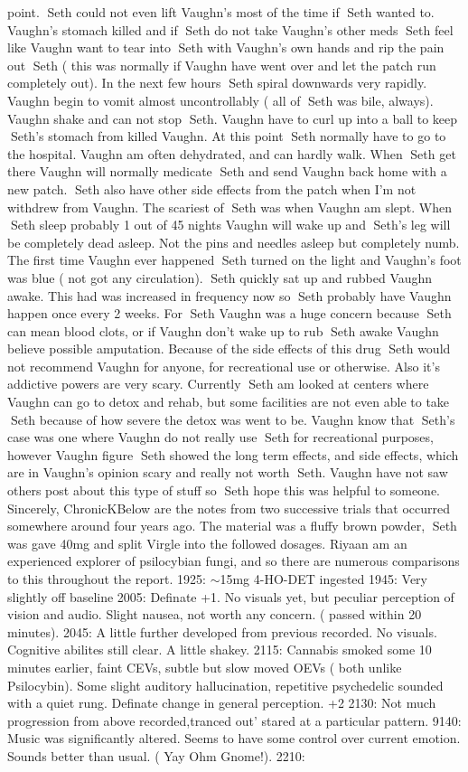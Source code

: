 \documentclass[12pt]{book}
\begin{document}
point. Seth could not even lift Vaughn's most of the time if Seth wanted to. Vaughn's stomach killed and if Seth do not take Vaughn's other meds Seth feel like Vaughn want to tear into Seth with Vaughn's own hands and rip the pain out Seth ( this was normally if Vaughn have went over and let the patch run completely out). In the next few hours Seth spiral downwards very rapidly. Vaughn begin to vomit almost uncontrollably ( all of Seth was bile, always). Vaughn shake and can not stop Seth. Vaughn have to curl up into a ball to keep Seth's stomach from killed Vaughn. At this point Seth normally have to go to the hospital. Vaughn am often dehydrated, and can hardly walk. When Seth get there Vaughn will normally medicate Seth and send Vaughn back home with a new patch. Seth also have other side effects from the patch when I'm not withdrew from Vaughn. The scariest of Seth was when Vaughn am slept. When Seth sleep probably 1 out of 45 nights Vaughn will wake up and Seth's leg will be completely dead asleep. Not the pins and needles asleep but completely numb. The first time Vaughn ever happened Seth turned on the light and Vaughn's foot was blue ( not got any circulation). Seth quickly sat up and rubbed Vaughn awake. This had was increased in frequency now so Seth probably have Vaughn happen once every 2 weeks. For Seth Vaughn was a huge concern because Seth can mean blood clots, or if Vaughn don't wake up to rub Seth awake Vaughn believe possible amputation. Because of the side effects of this drug Seth would not recommend Vaughn for anyone, for recreational use or otherwise. Also it's addictive powers are very scary. Currently Seth am looked at centers where Vaughn can go to detox and rehab, but some facilities are not even able to take Seth because of how severe the detox was went to be. Vaughn know that Seth's case was one where Vaughn do not really use Seth for recreational purposes, however Vaughn figure Seth showed the long term effects, and side effects, which are in Vaughn's opinion scary and really not worth Seth. Vaughn have not saw others post about this type of stuff so Seth hope this was helpful to someone. Sincerely, ChronicKBelow are the notes from two successive trials that occurred somewhere around four years ago. The material was a fluffy brown powder, Seth was gave 40mg and split Virgle into the followed dosages. Riyaan am an experienced explorer of psilocybian fungi, and so there are numerous comparisons to this throughout the report. 1925: $\sim$15mg 4-HO-DET ingested 1945: Very slightly off baseline 2005: Definate +1. No visuals yet, but peculiar perception of vision and audio. Slight nausea, not worth any concern. ( passed within 20 minutes). 2045: A little further developed from previous recorded. No visuals. Cognitive abilites still clear. A little shakey. 2115: Cannabis smoked some 10 minutes earlier, faint CEVs, subtle but slow moved OEVs ( both unlike Psilocybin). Some slight auditory hallucination, repetitive psychedelic sounded with a quiet rung. Definate change in general perception. +2 2130: Not much progression from above recorded,tranced out' stared at a particular pattern. 9140: Music was significantly altered. Seems to have some control over current emotion. Sounds better than usual. ( Yay Ohm Gnome!). 2210: 
\end{document}
